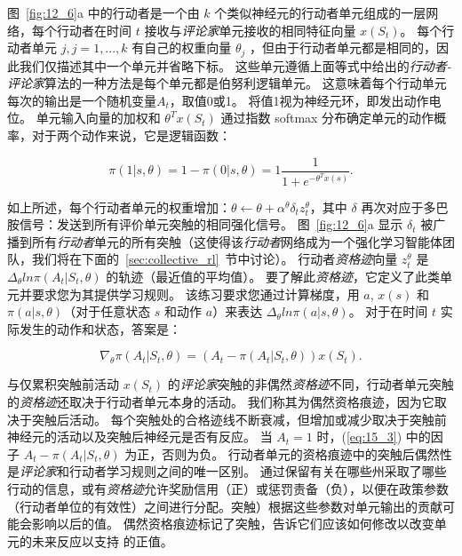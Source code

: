 图~\ref{fig:12_6}a 中的行动者是一个由 $k$ 个类似神经元的行动者单元组成的一层网络，每个行动者在时间 $t$ 接收与\textit{评论家}单元接收的相同特征向量 $x(S_t)$。
每个行动者单元 $j, j=1, ..., k$ 有自己的权重向量 $\theta_j$ ，但由于行动者单元都是相同的，因此我们仅描述其中一个单元并省略下标。
这些单元遵循上面等式中给出的\textit{行动者-评论家}算法的一种方法是每个单元都是伯努利逻辑单元。
这意味着每个行动单元每次的输出是一个随机变量$A_t$，取值0或1。
将值1视为神经元环，即发出动作电位。
单元输入向量的加权和 $\theta^T x(S_t)$ 通过指数 softmax 分布确定单元的动作概率，对于两个动作来说，它是逻辑函数：

\begin{equation} \label{eq:15_2}
	\pi (1|s, \theta) = 
		1 - \pi(0|s, \theta) 
		= 1 \frac{1}{1 + e^{-\theta^T x(s)}}.
\end{equation}


如上所述，每个行动者单元的权重增加：$\theta \longleftarrow \theta + \alpha^{\theta} \delta_t z_t^{\theta}$，其中 $\delta$ 再次对应于多巴胺信号：发送到所有评价单元突触的相同强化信号。
图~\ref{fig:12_6}a 显示 $\delta_t$ 被广播到所有\textit{行动者}单元的所有突触（这使得该\textit{行动者}网络成为一个强化学习智能体团队，我们将在下面的~\ref{sec:collective_rl}~节中讨论）。
行动者\textit{资格迹}向量 $z_t^{\theta}$ 是 $\Delta_\theta ln \pi (A_t|S_t, \theta)$ 的轨迹（最近值的平均值）。
要了解此\textit{资格迹}，它定义了此类单元并要求您为其提供学习规则。
该练习要求您通过计算梯度，用 $a$, $x(s)$ 和 $\pi(a|s, \theta)$（对于任意状态 $s$ 和动作 $a$）来表达 $\Delta _\theta ln \pi (a|s, \theta)$。
对于在时间 $t$ 实际发生的动作和状态，答案是：

\begin{equation} \label{eq:15_3}
	\nabla_{\theta} \pi (A_t | S_t, \theta)
		= (A_t - \pi(A_t|S_t, \theta)) x(S_t).
\end{equation}


与仅累积突触前活动 $x(S_t)$ 的\textit{评论家}突触的非偶然\textit{资格迹}不同，行动者单元突触的\textit{资格迹}还取决于行动者单元本身的活动。
我们称其为偶然资格痕迹，因为它取决于突触后活动。
每个突触处的合格迹线不断衰减，但增加或减少取决于突触前神经元的活动以及突触后神经元是否有反应。
当 $A_t = 1$ 时，(\ref{eq:15_3}) 中的因子 $A_t - \pi(A_t|S_t, \theta)$ 为正，否则为负。
行动者单元的资格痕迹中的突触后偶然性是\textit{评论家}和行动者学习规则之间的唯一区别。
通过保留有关在哪些州采取了哪些行动的信息，或有\textit{资格迹}允许奖励信用（正）或惩罚责备（负），以便在政策参数（行动者单位的有效性）之间进行分配。突触）根据这些参数对单元输出的贡献可能会影响以后的值。
偶然资格痕迹标记了突触，告诉它们应该如何修改以改变单元的未来反应以支持 的正值。


